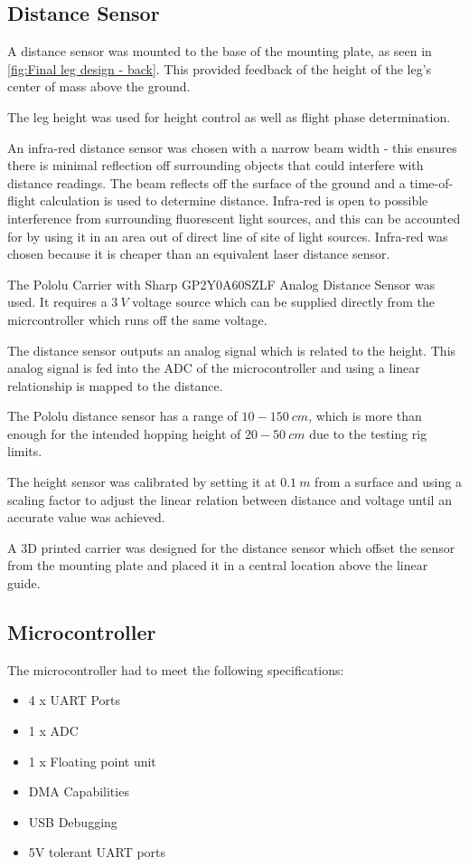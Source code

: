 \subsection{Distance Sensor}
A distance sensor was mounted to the base of the mounting plate, as seen in \cref{fig:Final leg design - back}. This provided feedback of the height of the leg's center of mass above the ground.

The leg height was used for height control as well as flight phase determination.

An infra-red distance sensor was chosen with a narrow beam width - this ensures there is minimal reflection off surrounding objects that could interfere with distance readings. The beam reflects off the surface of the ground and a time-of-flight calculation is used to determine distance. Infra-red is open to possible interference from surrounding fluorescent light sources, and this can be accounted for by using it in an area out of direct line of site of light sources. Infra-red was chosen because it is cheaper than an equivalent laser distance sensor.

The Pololu Carrier with Sharp GP2Y0A60SZLF Analog Distance Sensor was used. It requires a $3\ V$ voltage source which can be supplied directly from the micrcontroller which runs off the same voltage. 

The distance sensor outputs an analog signal which is related to the height. This analog signal is fed into the ADC of the microcontroller and using a linear relationship is mapped to the distance. 

The Pololu distance sensor has a range of $10-150\ cm$, which is more than enough for the intended hopping height of $20-50\ cm$ due to the testing rig limits.

The height sensor was calibrated by setting it at $0.1\ m$ from a surface and using a scaling factor to adjust the linear relation between distance and voltage until an accurate value was achieved. 

A 3D printed carrier was designed for the distance sensor which offset the sensor from the mounting plate and placed it in a central location above the linear guide.

\subsection{Microcontroller}
The microcontroller had to meet the following specifications:
\begin{itemize}
\item 4 x UART Ports
\item 1 x ADC
\item 1 x Floating point unit
\item DMA Capabilities
\item USB Debugging
\item 5V tolerant UART ports
\end{itemize}

